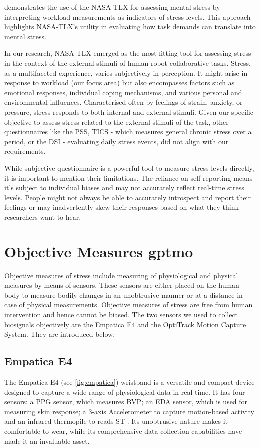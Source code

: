  \textcite{tlxstress} demonstrates the use of the \gls{NASA-TLX} for assessing mental stress by interpreting workload measurements as indicators of stress levels. This approach highlights \gls{NASA-TLX}'s utility in evaluating how task demands can translate into mental stress.
 
 In our research, \gls{NASA-TLX} emerged as the most fitting tool for assessing stress in the context of the external stimuli of human-robot collaborative tasks. Stress, as a multifaceted experience, varies subjectively in perception. It might arise in response to workload (our focus area) but also encompasses factors such as emotional responses, individual coping mechanisms, and various personal and environmental influences. Characterised often by feelings of strain, anxiety, or pressure, stress responds to both internal and external stimuli. Given our specific objective to assess stress related to the external stimuli of the task, other questionnaires like the \gls{PSS}, \gls{TICS} \parencite{tics} - which measures general chronic stress over a period, or the \gls{DSI} \parencite{dsi} - evaluating daily stress events, did not align with our requirements.

While subjective questionnaire is a powerful tool to measure stress levels directly, it is important to mention their limitations. The reliance on self-reporting means it's subject to individual biases and may not accurately reflect real-time stress levels. People might not always be able to accurately introspect and report their feelings or may inadvertently skew their responses based on what they think researchers want to hear.




\section{Objective Measures \gls{gptmo}}
Objective measures of stress include measuring of physiological and physical measures by means of sensors. These sensors are either placed on the human body to measure bodily changes in an unobtrusive manner or at a distance in case of physical measurements. Objective measures of stress are free from human intervention and hence cannot be biased. 
The two sensors we used to collect biosignals objectively are the Empatica E4 and the OptiTrack Motion Capture System. They are introduced below:

\subsection{Empatica E4}
The Empatica E4 \parencite{empatica} (see \autoref*{fig:empatica}) wristband is a versatile and compact device designed to capture a wide range of physiological data in real time. 
It has four sensors: a \gls{PPG} sensor, which measures \gls{BVP}; an \gls{EDA} sensor, which is used for measuring skin response; a 3-axis Accelerometer to capture motion-based activity and an infrared thermopile to reads \gls{ST} \parencite{empa}. Its unobtrusive nature makes it comfortable to wear, while its comprehensive data collection capabilities have made it an invaluable asset.

